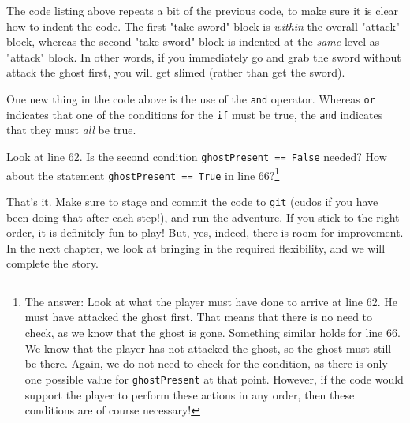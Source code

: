 The code listing above repeats a bit of the previous code, to make sure it is clear how to indent the code. The first "take sword" block is \emph{within} the overall "attack" block, whereas the second "take sword" block is indented at the \emph{same} level as "attack" block. In other words, if you immediately go and grab the sword without attack the ghost first, you will get slimed (rather than get the sword). 

One new thing in the code above is the use of the \texttt{and} operator. Whereas \texttt{or} indicates that one of the conditions for the \texttt{if} must be true, the \texttt{and} indicates that they must \emph{all} be true. 

\begin{Exe} 
Look at line 62. Is the second condition \texttt{ghostPresent == False} needed? How about the statement \texttt{ghostPresent == True} in line 66?\footnote{The answer: Look at what the player must have done to arrive at line 62. He must have attacked the ghost first. That means that there is no need to check, as we know that the ghost is gone. Something similar holds for line 66. We know that the player has not attacked the ghost, so the ghost must still be there. Again, we do not need to check for the condition, as there is only one possible value for \texttt{ghostPresent} at that point. However, if the code would support the player to perform these actions in any order, then these conditions are of course necessary!}   
\end{Exe}  

That's it. Make sure to stage and commit the code to \texttt{git} (cudos if you have been doing that after each step!), and run the adventure. If you stick to the right order, it is definitely fun to play! But, yes, indeed, there is room for improvement. In the next chapter, we look at bringing in the required flexibility, and we will complete the story.  






  